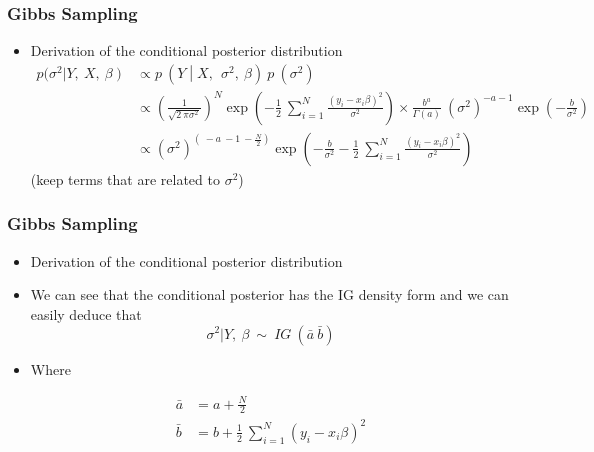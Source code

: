 \documentclass[
  shownotes,
  xcolor={svgnames},
  hyperref={colorlinks,citecolor=DarkBlue,linkcolor=DarkRed,urlcolor=DarkBlue}
  , aspectratio=169]{beamer}
\begin{document}
\begin{frame}[fragile]
\frametitle{Gibbs Sampling} 


\begin{itemize}
\item Derivation of the conditional posterior distribution
\medskip
\begin{align}
p ({\sigma}^{2}\left| Y,\ X,\ \beta \right) &\propto p\ \left( Y \middle| X,\ \ \sigma^{2},\ \beta \right)\ p\ (\sigma^{2})\  \\  \nonumber
&\propto \left( \frac{1}{\sqrt{2\ \pi\sigma^{2}}} \right)^{N}\exp\left( - \frac{1}{2}\ \sum_{i = 1}^{N}\frac{\left( y_{i} - x_{i}\beta \right)^{2}}{\sigma^{2}} \right) \times \frac{b^{a}}{\Gamma(a)}\ \left( \sigma^{2} \right)^{- a - 1}\exp\left( - \frac{b}{\sigma^{2}} \right) \\ \nonumber
&\propto \left( \sigma^{2} \right)^{\left( \  - a\  - 1\  - \frac{N}{2} \right)}\exp\left( - \frac{b}{\sigma^{2}} - \frac{1}{2}\ \sum_{i = 1}^{N}\frac{\left( y_{i} - x_{i}\beta \right)^{2}}{\sigma^{2}} \right) \nonumber
\end{align}
(keep terms that are related to $\sigma^{2}$)

\end{itemize}

 \end{frame}
\begin{frame}[fragile]
\frametitle{Gibbs Sampling} 


\begin{itemize}
\item Derivation of the conditional posterior distribution
\medskip
\item We can see that the conditional posterior has the IG density form and we can easily deduce that
\medskip
$$\sigma^{2}|Y,\ \beta\ \sim\ IG\ (\bar{a}\ \bar{b})$$

\medskip
\item  Where

\begin{align}
 \bar{a} &= a + \frac{N}{2} \\ \nonumber
 \bar{b} &= b + \frac{1}{2}\ \sum_{i = 1}^{N}\left( y_{i} - x_{i}\beta \right)^{2} \nonumber
\end{align}

\end{itemize}
 \end{frame}
\end{document}
